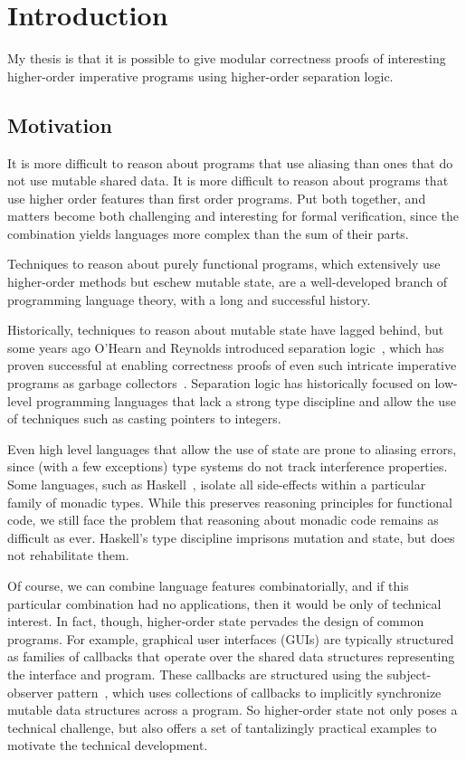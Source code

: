 \chapter{Introduction}

My thesis is that it is possible to give modular correctness proofs of
interesting higher-order imperative programs using higher-order
separation logic.

\section{Motivation}

It is more difficult to reason about programs that use aliasing than
ones that do not use mutable shared data. It is more difficult to
reason about programs that use higher order features than first order
programs. Put both together, and matters become both challenging and
interesting for formal verification, since the combination yields
languages more complex than the sum of their parts. 

Techniques to reason about purely functional programs, which
extensively use higher-order methods but eschew mutable state, are a
well-developed branch of programming language theory, with a
long and successful history.

Historically, techniques to reason about mutable state have lagged
behind, but some years ago O'Hearn and Reynolds introduced separation
logic~\citep{sep-logic}, which has proven successful at enabling
correctness proofs of even such intricate imperative programs as
garbage collectors~\citep{gc-proof}. Separation logic has historically
focused on low-level programming languages that lack a strong type
discipline and allow the use of techniques such as casting pointers to
integers.

Even high level languages that allow the use of state are prone to
aliasing errors, since (with a few exceptions) type systems do not
track interference properties. Some languages, such as
Haskell~\cite{haskell-report}, isolate all side-effects within a
particular family of monadic types. While this preserves reasoning
principles for functional code, we still face the problem that
reasoning about monadic code remains as difficult as ever. Haskell's
type discipline imprisons mutation and state, but does not
rehabilitate them.

Of course, we can combine language features combinatorially, and if
this particular combination had no applications, then it would be only
of technical interest. In fact, though, higher-order state pervades
the design of common programs. For example, graphical user interfaces
(GUIs) are typically structured as families of callbacks that operate
over the shared data structures representing the interface and
program. These callbacks are structured using the subject-observer
pattern~\cite{gof}, which uses collections of callbacks to implicitly
synchronize mutable data structures across a program. So higher-order
state not only poses a technical challenge, but also offers a set of
tantalizingly practical examples to motivate the technical
development.


